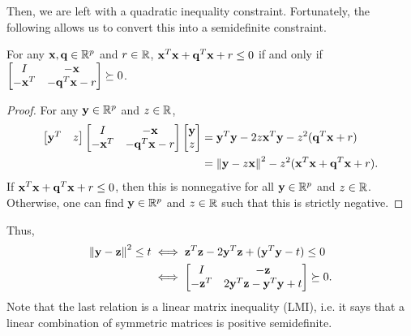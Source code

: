 \documentclass[11pt]{article}
\begin{document}
Then, we are left with a quadratic inequality constraint. Fortunately, the following allows us to convert this into a semidefinite constraint.
\begin{lemma}
For any ${\bf x}, {\bf q} \in {\mathbb R}^p$ and $r \in {\mathbb R}$, ${\bf x}^T{\bf x} + {\bf q}^T{\bf x} + r \leq 0$ if and only if $\begin{bmatrix} I & -{\bf x} \\ -{\bf x}^T & -{\bf q}^T{\bf x} - r \end{bmatrix} \succeq 0$.
\end{lemma}
\begin{proof}
For any ${\bf y} \in {\mathbb R}^p$ and $z \in {\mathbb R}$, 
\begin{align*}
\begin{bmatrix} {\bf y}^T & z \end{bmatrix} \begin{bmatrix} I & -{\bf x} \\ -{\bf x}^T & -{\bf q}^T{\bf x} - r \end{bmatrix} \begin{bmatrix} {\bf y} \\ z \end{bmatrix} &= {\bf y}^T{\bf y} -2z{\bf x}^T{\bf y} - z^2({\bf q}^T{\bf x}+r) \\
&= \left\lVert {\bf y} - z{\bf x} \right\rVert^2 - z^2({\bf x}^T{\bf x} + {\bf q}^T{\bf x} + r).
\end{align*}
If ${\bf x}^T{\bf x} + {\bf q}^T{\bf x} + r \leq 0$, then this is nonnegative for all ${\bf y} \in {\mathbb R}^p$ and $z \in {\mathbb R}$. Otherwise, one can find ${\bf y} \in {\mathbb R}^p$ and $z \in {\mathbb R}$ such that this is strictly negative.
\end{proof}

Thus,
\begin{align*}
\left\lVert {\bf y}-{\bf z} \right\rVert^2 \leq t &\iff {\bf z}^T{\bf z} - 2{\bf y}^T{\bf z} + ({\bf y}^T{\bf y} - t) \leq 0 \\
&\iff \begin{bmatrix} I & -{\bf z} \\ -{\bf z}^T & 2{\bf y}^T{\bf z} - {\bf y}^T{\bf y} + t \end{bmatrix} \succeq 0.
\end{align*}
Note that the last relation is a linear matrix inequality (LMI), i.e. it says that a linear combination of symmetric matrices is positive semidefinite. 
\end{document}
